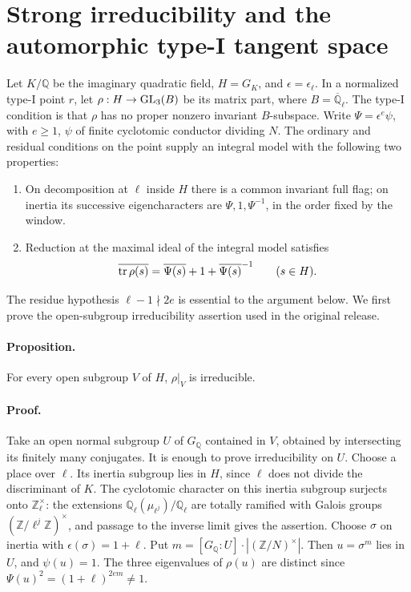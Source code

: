 \section{Strong irreducibility and the automorphic type-I tangent space}
\label{sec:type-one-rigidity}

Let \(K/\mathbb Q\) be the imaginary quadratic field,
\(H=G_K\), and \(\epsilon=\epsilon_\ell\). In a normalized type-I
point \(r\), let \(\rho:H\to {\rm GL}_3(B)\) be its matrix part,
where \(B=\overline{\mathbb Q}_\ell\). The type-I condition is that
\(\rho\) has no proper nonzero invariant \(B\)-subspace. Write
\(\Psi=\epsilon^e\psi\), with \(e\ge1\), \(\psi\) of finite
cyclotomic conductor dividing \(N\). The ordinary and residual
conditions on the point supply an integral model with the following
two properties:
\begin{enumerate}
\item On decomposition at \(\ell\) inside \(H\) there is a common
invariant full flag; on inertia its successive eigencharacters
are \(\Psi,1,\Psi^{-1}\), in the order fixed by the window.
\item Reduction at the maximal ideal of the integral model satisfies
\[
 \overline{{\rm tr}\,\rho(s)}
   =\overline{\Psi(s)}+1+\overline{\Psi(s)}^{-1}
           \qquad(s\in H).
\]
\end{enumerate}
The residue hypothesis \(\ell-1\nmid 2e\) is essential to the
argument below. We first prove the open-subgroup irreducibility
assertion used in the original release.

\paragraph{Proposition.}
For every open subgroup \(V\) of \(H\), \(\rho|_V\) is irreducible.

\paragraph{Proof.}
Take an open normal subgroup \(U\) of \(G_\mathbb Q\) contained
in \(V\), obtained by intersecting its finitely many conjugates.
It is enough to prove irreducibility on \(U\). Choose a place over
\(\ell\). Its inertia subgroup lies in \(H\), since \(\ell\) does
not divide the discriminant of \(K\). The cyclotomic character on
this inertia subgroup surjects onto \(\mathbb Z_\ell^\times\):
the extensions \(\mathbb Q_\ell(\mu_{\ell^j})/\mathbb Q_\ell\)
are totally ramified with Galois groups
\((\mathbb Z/\ell^j\mathbb Z)^\times\), and passage to the inverse
limit gives the assertion. Choose \(\sigma\) on inertia with
\(\epsilon(\sigma)=1+\ell\). Put
\(m=[G_\mathbb Q:U]\cdot|(\mathbb Z/N)^\times|\). Then
\(u=\sigma^m\) lies in \(U\), and \(\psi(u)=1\). The three
eigenvalues of \(\rho(u)\) are distinct since
\(\Psi(u)^2=(1+\ell)^{2em}\ne1\).

